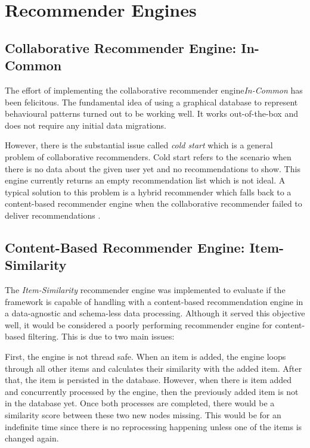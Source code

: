 \section{Recommender Engines}
\label{evaluation-engines}

\subsection{Collaborative Recommender Engine: In-Common}

The effort of implementing the collaborative recommender engine\emph{In-Common} has been felicitous. The fundamental idea of using a graphical database to represent behavioural patterns turned out to be working well. It works out-of-the-box and does not require any initial data migrations.

However, there is the substantial issue called \emph{cold start} which is a general problem of collaborative recommenders. Cold start refers to the scenario when there is no data about the given user yet and no recommendations to show. This engine currently returns an empty recommendation list which is not ideal. A typical solution to this problem is a hybrid recommender which falls back to a content-based recommender engine when the collaborative recommender failed to deliver recommendations \cite{schein2002methods}.

\subsection{Content-Based Recommender Engine: Item-Similarity}

The \emph{Item-Similarity} recommender engine was implemented to evaluate if the framework is capable of handling with a content-based recommendation engine in a data-agnostic and schema-less data processing. Although it served this objective well, it would be considered a poorly performing recommender engine for content-based filtering. This is due to two main issues:

First, the engine is not thread safe. When an item is added, the engine loops through all other items and calculates their similarity with the added item. After that, the item is persisted in the database. However, when there is item added and concurrently processed by the engine, then the previously added item is not in the database yet. Once both processes are completed, there would be a similarity score between these two new nodes missing. This would be for an indefinite time since there is no reprocessing happening unless one of the items is changed again.

